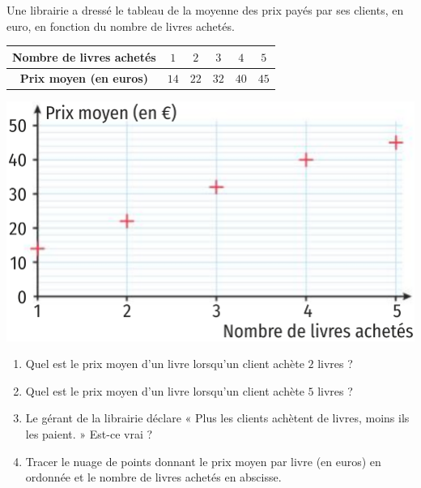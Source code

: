 \documentclass[11pt]{article}
\begin{document}
\begin{exemple}
    Une librairie a dressé le tableau de la moyenne des prix payés par ses
    clients, en euro, en fonction du nombre de livres achetés.\\
    \begin{center}
    \begin{tabular}[]{cccccc}
      \toprule
      \textbf{Nombre de livres achetés} & $1$ & $2$ & $3$ & $4$ & $5$ \\
      \midrule
      \textbf{Prix moyen (en euros)} & $14$ & $22$ & $32$ & $40$ & $45$\\
      \bottomrule
    \end{tabular}
    \end{center}
\begin{center}
  \includegraphics[scale=.25]{nuage2.png}
\end{center}
\begin{enumerate}
  \item Quel est le prix moyen d'un livre lorsqu'un client achète $2$ livres ?
  \item Quel est le prix moyen d'un livre lorsqu'un client achète $5$ livres ?
  \item Le gérant de la librairie déclare « Plus les clients achètent de livres,
    moins ils les paient. » Est-ce vrai ?
  \item Tracer le nuage de points donnant le prix moyen par livre (en euros) en
    ordonnée et le nombre de livres achetés en abscisse.
\end{enumerate}
\end{exemple}
\end{document}
